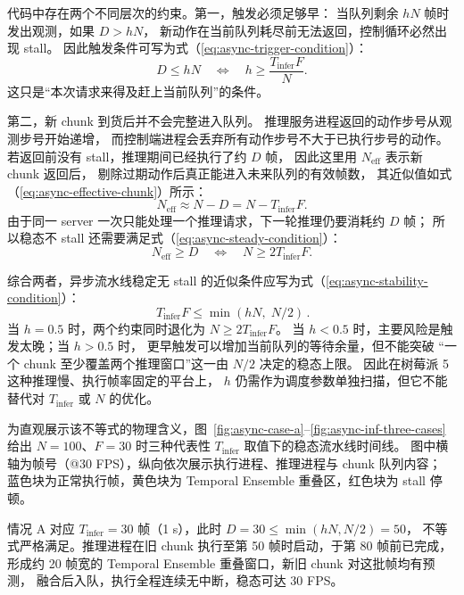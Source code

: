 代码中存在两个不同层次的约束。第一，触发必须足够早：
当队列剩余 $hN$ 帧时发出观测，如果 $D>hN$，
新动作在当前队列耗尽前无法返回，控制循环必然出现 stall。
因此触发条件可写为式（\ref{eq:async-trigger-condition}）：
\begin{equation}
  D \leq hN
  \quad\Longleftrightarrow\quad
  h \geq \frac{T_{\text{infer}}F}{N}.
  \label{eq:async-trigger-condition}
\end{equation}
这只是``本次请求来得及赶上当前队列''的条件。

第二，新 chunk 到货后并不会完整进入队列。
推理服务进程返回的动作步号从观测步号开始递增，
而控制端进程会丢弃所有动作步号不大于已执行步号的动作。
若返回前没有 stall，推理期间已经执行了约 $D$ 帧，
因此这里用 $N_{\text{eff}}$ 表示新 chunk 返回后，
剔除过期动作后真正能进入未来队列的有效帧数，
其近似值如式（\ref{eq:async-effective-chunk}）所示：
\begin{equation}
  N_{\text{eff}} \approx N - D = N - T_{\text{infer}}F.
  \label{eq:async-effective-chunk}
\end{equation}
由于同一 server 一次只能处理一个推理请求，下一轮推理仍要消耗约 $D$ 帧；
所以稳态不 stall 还需要满足式（\ref{eq:async-steady-condition}）：
\begin{equation}
  N_{\text{eff}} \geq D
  \quad\Longleftrightarrow\quad
  N \geq 2T_{\text{infer}}F.
  \label{eq:async-steady-condition}
\end{equation}

综合两者，异步流水线稳定无 stall 的近似条件应写为式（\ref{eq:async-stability-condition}）：
\begin{equation}
  \boxed{\,T_{\text{infer}}F \leq \min(hN,\; N/2)\,}.
  \label{eq:async-stability-condition}
\end{equation}
当 $h=0.5$ 时，两个约束同时退化为 $N \geq 2T_{\text{infer}}F$。
当 $h<0.5$ 时，主要风险是触发太晚；当 $h>0.5$ 时，
更早触发可以增加当前队列的等待余量，但不能突破
``一个 chunk 至少覆盖两个推理窗口''这一由 $N/2$ 决定的稳态上限。
因此在树莓派 5 这种推理慢、执行帧率固定的平台上，
$h$ 仍需作为调度参数单独扫描，但它不能替代对 $T_{\text{infer}}$ 或 $N$ 的优化。

为直观展示该不等式的物理含义，图~\ref{fig:async-case-a}--\ref{fig:async-inf-three-cases}
给出 $N=100$、$F=30$ 时三种代表性 $T_{\text{infer}}$ 取值下的稳态流水线时间线。
图中横轴为帧号（@30 FPS），纵向依次展示执行进程、推理进程与 chunk 队列内容；
蓝色块为正常执行帧，黄色块为 Temporal Ensemble 重叠区，红色块为 stall 停顿。

情况 A 对应 $T_{\text{infer}}=30$ 帧（1 s），此时 $D=30 \leq \min(hN,N/2)=50$，
不等式严格满足。推理进程在旧 chunk 执行至第 50 帧时启动，于第 80 帧前已完成，
形成约 20 帧宽的 Temporal Ensemble 重叠窗口，新旧 chunk 对这批帧均有预测，
融合后入队，执行全程连续无中断，稳态可达 30 FPS。

